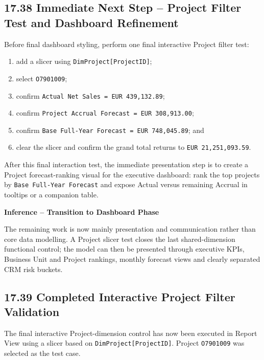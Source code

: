 \documentclass[11pt,a4paper]{article}
\begin{document}
\subsection{17.38 Immediate Next Step -- Project Filter Test and Dashboard Refinement}

Before final dashboard styling, perform one final interactive Project filter test:

\begin{enumerate}[leftmargin=9mm,itemsep=2pt]
    \item add a slicer using \texttt{DimProject[ProjectID]};
    \item select \texttt{O7901009};
    \item confirm \texttt{Actual Net Sales = EUR 439,132.89};
    \item confirm \texttt{Project Accrual Forecast = EUR 308,913.00};
    \item confirm \texttt{Base Full-Year Forecast = EUR 748,045.89}; and
    \item clear the slicer and confirm the grand total returns to
    \texttt{EUR 21,251,093.59}.
\end{enumerate}

After this final interaction test, the immediate presentation step is to create a
Project forecast-ranking visual for the executive dashboard: rank the top projects
by \texttt{Base Full-Year Forecast} and expose Actual versus remaining Accrual in
tooltips or a companion table.

\begin{inferencebox}

\textbf{Inference -- Transition to Dashboard Phase}

The remaining work is now mainly presentation and communication rather than core
data modelling. A Project slicer test closes the last shared-dimension functional
control; the model can then be presented through executive KPIs, Business Unit and
Project rankings, monthly forecast views and clearly separated CRM risk buckets.

\end{inferencebox}


\subsection{17.39 Completed Interactive Project Filter Validation}

The final interactive Project-dimension control has now been executed in Report
View using a slicer based on \texttt{DimProject[ProjectID]}. Project
\texttt{O7901009} was selected as the test case.
\end{document}

